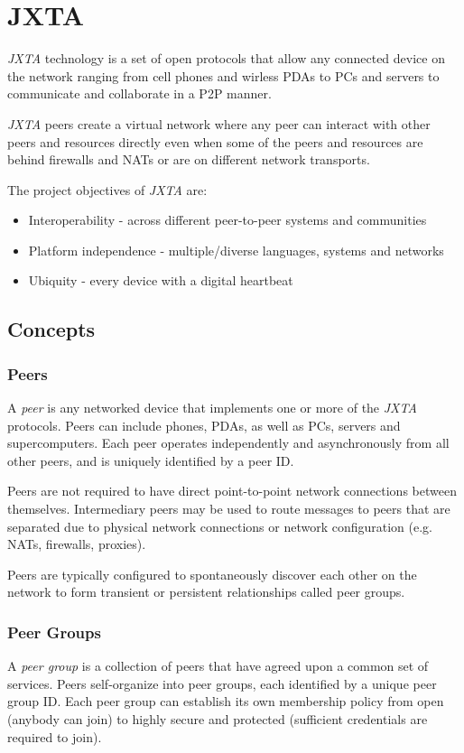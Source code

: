 \section{JXTA}
\label{sect:jxta}

\emph{JXTA} technology is a set of open protocols that allow any connected device on the network ranging from cell phones and wirless PDAs to PCs and servers to communicate and collaborate in a P2P manner.

\emph{JXTA} peers create a virtual network where any peer can interact with other peers and resources directly even when some of the peers and resources are behind firewalls and NATs or are on different network transports.

The project objectives of \emph{JXTA} are:
\begin{itemize}
 \item Interoperability - across different peer-to-peer systems and communities
 \item Platform independence - multiple/diverse languages, systems and networks
 \item Ubiquity - every device with a digital heartbeat
\end{itemize}


\subsection{Concepts}

\subsubsection{Peers}
A \emph{peer} is any networked device that implements one or more of the \emph{JXTA} protocols. Peers can include phones, PDAs, as well as PCs, servers and supercomputers. Each peer operates independently and asynchronously from all other peers, and is uniquely identified by a peer ID.

Peers are not required to have direct point-to-point network connections between themselves. Intermediary peers may be used to route messages to peers that are separated due to physical network connections or network configuration (e.g. NATs, firewalls, proxies).

Peers are typically configured to spontaneously discover each other on the network to form transient or persistent relationships called peer groups.

\subsubsection{Peer Groups}
A \emph{peer group} is a collection of peers that have agreed upon a common set of services. Peers self-organize into peer groups, each identified by a unique peer group ID. Each peer group can establish its own membership policy from open (anybody can join) to highly secure and protected (sufficient credentials are required to join).

